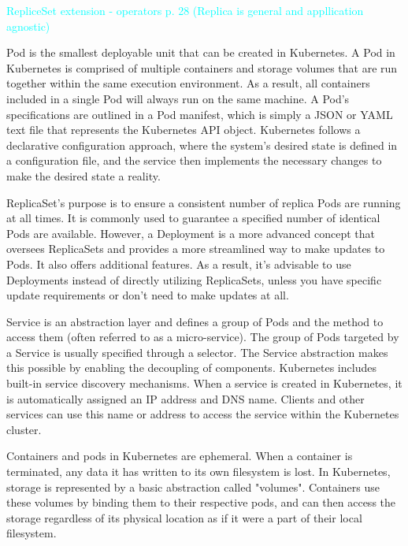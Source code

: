 \label{chap:kubeConcepts}
\textcolor{cyan}{RepliceSet extension - operators p. 28 (Replica is general and appllication agnostic) }

Pod is the smallest deployable unit that can be created in Kubernetes. \cite{docuKubePods} A Pod in Kubernetes is comprised of multiple containers and storage volumes that are run together within the same execution environment. As a result, all containers included in a single Pod will always run on the same machine. \cite{kubeUpAndRunningPods}
A Pod's specifications are outlined in a Pod manifest, which is simply a JSON or YAML text file that represents the Kubernetes API object. Kubernetes follows a declarative configuration approach, where the system's desired state is defined in a configuration file, and the service then implements the necessary changes to make the desired state a reality. \cite{docuKubeStaticPod}

ReplicaSet’s purpose is to ensure a consistent number of replica Pods are running at all times. It is commonly used to guarantee a specified number of identical Pods are available. However, a Deployment is a more advanced concept that oversees ReplicaSets and provides a more streamlined way to make updates to Pods. It also offers additional features. As a result, it's advisable to use Deployments instead of directly utilizing ReplicaSets, unless you have specific update requirements or don't need to make updates at all. \cite{docuKubeReplicaset}

Service is an abstraction layer and defines a group of Pods and the method to access them (often referred to as a micro-service). The group of Pods targeted by a Service is usually specified through a selector. The Service abstraction makes this possible by enabling the decoupling of components. \cite{docuKubeSevice} Kubernetes includes built-in service discovery mechanisms. When a service is created in Kubernetes, it is automatically assigned an IP address and DNS name. Clients and other services can use this name or address to access the service within the Kubernetes cluster. \cite{docuKubeSevice}

Containers and pods in Kubernetes are ephemeral. When a container is terminated, any data it has written to its own filesystem is lost. In Kubernetes, storage is represented by a basic abstraction called "volumes". Containers use these volumes by binding them to their respective pods, and can then access the storage regardless of its physical location as if it were a part of their local filesystem. \cite{masteringKubernetesStorage}

